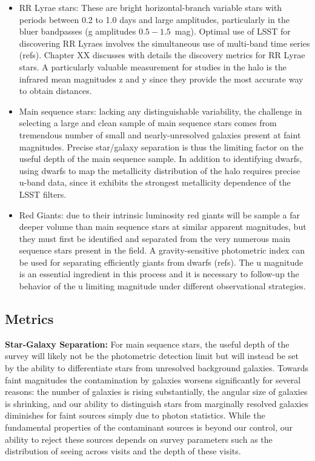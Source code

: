 \begin{itemize}

\item RR Lyrae stars: These are bright horizontal-branch variable stars with
periods between 0.2 to 1.0 days and large amplitudes, particularly in the bluer 
bandpasses (g amplitudes $0.5 - 1.5$~mag). Optimal use of LSST for discovering
RR Lyraes involves the simultaneous use of multi-band time series (refs).
Chapter XX discusses with details the discovery metrics for RR Lyrae stars.
A particularly valuable measurement for studies in the halo is the infrared mean
magnitudes z and y since they provide the most accurate way to obtain 
distances.

\item Main sequence stars: lacking any distinguishable variability, the
challenge in selecting a large and clean sample of main sequence stars comes
from tremendous number of small and nearly-unresolved galaxies present at
faint magnitudes. Precise star/galaxy separation is thus the limiting factor
on the useful depth of the main sequence sample. In addition to identifying
dwarfs, using dwarfs to map the metallicity distribution of the halo requires
precise u-band data, since it exhibits the strongest metallicity dependence of
the LSST filters.

\item Red Giants: due to their intrinsic luminosity red giants will be sample
a far deeper volume than main sequence stars at similar apparent magnitudes,
but they must first be identified and separated from the very numerous main
sequence stars present in the field. A gravity-sensitive photometric index can
be used for separating efficiently giants from dwarfs (refs). The u magnitude
is an essential ingredient in this process and it is necessary to follow-up
the behavior of the u limiting magnitude under different observational
strategies.

\end{itemize}


\subsection{Metrics}
\label{sec:keyword:MW_Halo_metrics}

\textbf{Star-Galaxy Separation:} For main sequence stars, the useful depth of
the survey will likely not be the photometric detection limit but will instead
be set by the ability to differentiate stars from unresolved background
galaxies. Towards faint magnitudes the contamination by galaxies worsens
significantly for several reasons: the number of galaxies is rising
substantially, the angular size of galaxies is shrinking, and our ability to
distinguish stars from marginally resolved galaxies diminishes for faint
sources simply due to photon statistics. While the fundamental properties of
the contaminant sources is beyond our control, our ability to reject these
sources depends on survey parameters such as the distribution of seeing across
visits and the depth of these visits.

